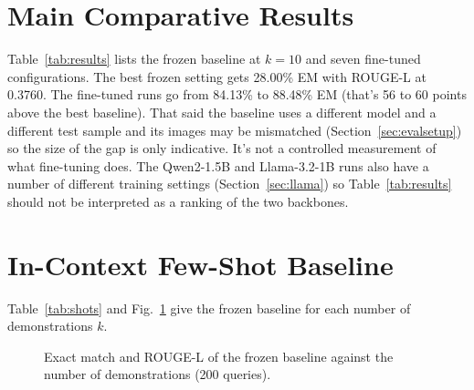 \documentclass[12pt]{report}
\begin{document}
\section{Main Comparative Results}
Table~\ref{tab:results} lists the frozen baseline at $k=10$ and seven fine-tuned configurations. The best frozen setting gets 28.00\% EM with ROUGE-L at 0.3760. The fine-tuned runs go from 84.13\% to 88.48\% EM (that's 56 to 60 points above the best baseline). That said the baseline uses a different model and a different test sample and its images may be mismatched (Section~\ref{sec:evalsetup}) so the size of the gap is only indicative. It's not a controlled measurement of what fine-tuning does. The Qwen2-1.5B and Llama-3.2-1B runs also have a number of different training settings (Section~\ref{sec:llama}) so Table~\ref{tab:results} should not be interpreted as a ranking of the two backbones.


\section{In-Context Few-Shot Baseline}
\label{sec:fewshot}
Table~\ref{tab:shots} and Fig.~\ref{fig:shots} give the frozen baseline for each number of demonstrations $k$.

\begin{figure}[htbp]
  \centering
  \caption{Exact match and ROUGE-L of the frozen baseline against the number of demonstrations (200 queries).}
  \label{fig:shots}
\end{figure}
\end{document}
